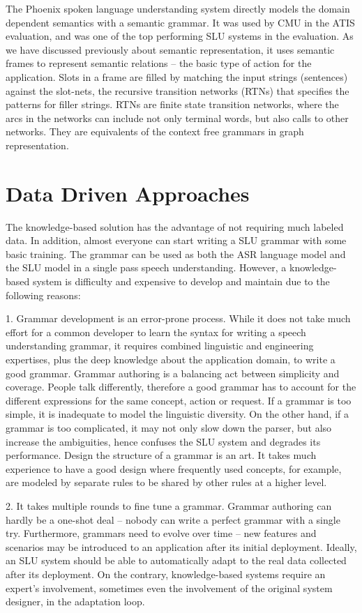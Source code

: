 The Phoenix spoken language understanding system \cite{d1e509} directly models the
domain dependent semantics with a semantic grammar. It was used by CMU in the ATIS
evaluation, and was one of the top performing SLU systems in the evaluation. As we have
discussed previously about semantic representation, it uses semantic frames to represent
semantic relations – the basic type of action for the application. Slots in a frame are filled by
matching the input strings (sentences) against the slot-nets, the recursive transition networks
(RTNs) that specifies the patterns for filler strings. RTNs are finite state transition networks,
where the arcs in the networks can include not only terminal words, but also calls to other
networks. They are equivalents of the context free grammars in graph representation.

\section{Data Driven Approaches}
The knowledge-based solution has the advantage of not requiring much labeled data. In
addition, almost everyone can start writing a SLU grammar with some basic training. The
grammar can be used as both the ASR language model and the SLU model in a single pass
speech understanding. However, a knowledge-based system is difficulty and expensive to
develop and maintain due to the following reasons:

1. Grammar development is an error-prone process. While it does not take much effort for
a common developer to learn the syntax for writing a speech understanding grammar,
it requires combined linguistic and engineering expertises, plus the deep knowledge
about the application domain, to write a good grammar. Grammar authoring is a
balancing act between simplicity and coverage. People talk differently, therefore a
good grammar has to account for the different expressions for the same concept, action
or request. If a grammar is too simple, it is inadequate to model the linguistic diversity.
On the other hand, if a grammar is too complicated, it may not only slow down the
parser, but also increase the ambiguities, hence confuses the SLU system and degrades
its performance. Design the structure of a grammar is an art. It takes much experience
to have a good design where frequently used concepts, for example, are modeled by
separate rules to be shared by other rules at a higher level.

2. It takes multiple rounds to fine tune a grammar. Grammar authoring can hardly be a
one-shot deal – nobody can write a perfect grammar with a single try. Furthermore,
grammars need to evolve over time – new features and scenarios may be introduced
to an application after its initial deployment. Ideally, an SLU system should be
able to automatically adapt to the real data collected after its deployment. On the
contrary, knowledge-based systems require an expert’s involvement, sometimes even
the involvement of the original system designer, in the adaptation loop.

